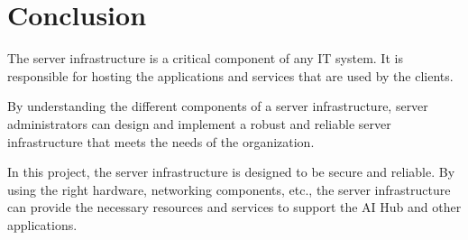 \cite{containerization} 

\section{Conclusion}

The server infrastructure is a critical component of any IT system. It is responsible for hosting the applications and services that are used by the clients.

By understanding the different components of a server infrastructure, server administrators can design and implement a robust and reliable server infrastructure that meets the needs of the organization.

In this project, the server infrastructure is designed to be secure and reliable. By using the right hardware, networking components, etc., the server infrastructure can provide the necessary resources and services to support the AI Hub and other applications.
